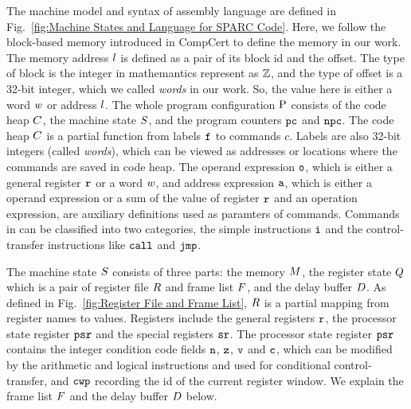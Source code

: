 		

The machine model and syntax of \sparc{} assembly language
are defined in Fig.~\ref{fig:Machine States and Language for SPARC Code}. 
Here, we follow the block-based memory \cite{CompCertMM} introduced 
in CompCert to define the memory in our work.   
The memory address $l$ is defined as a pair of 
its block id and the offset. The type of block is the integer 
in mathemantics represent as $\mathbb{Z}$, and the type of offset 
is a 32-bit integer, which we called {\it words} in our work. 
So, the value here is either a word $w$ or address $l$.  
The whole program configuration $\text{P}$ consists of the code heap
$C$, the machine state $S$, and the program counters $\texttt{pc}$
and $\texttt{npc}$.
The code heap $C$ is a partial function
from labels $\texttt{f}_{}$ to commands $c$.
Labels are also 32-bit integers (called {\em words}),
which can be viewed as addresses or locations 
where the commands are saved in code heap. 
The operand expression $\texttt{o}$, which is either a general 
register $\texttt{r}_{}$ or a word $w$, 
and address expression $\texttt{a}$, 
which is either a operand expression or a 
sum of the value of register $\texttt{r}_{}$ and an operation 
expression, are auxiliary definitions used as paramters of commands. 
Commands in \sparc{} can be classified into two categories,
the simple instructions $\texttt{i}$ and the
control-transfer instructions like $\texttt{call}$ and $\texttt{jmp}$.

The machine state $S$ consists of three parts:
the memory $M$, the register state $Q$
which is a pair of register file $R$ and frame list $F$,
and the delay buffer $D$.
As defined in Fig.~\ref{fig:Register File and Frame List},
$R$ is a partial mapping
from register names to values.
Registers include the general registers $\texttt{r}$,
the processor state register $\texttt{psr}$
and the special registers $\texttt{sr}$.
The processor state register $\texttt{psr}$ contains
the integer condition code fields $\texttt{n}$,
$\texttt{z}$, $\texttt{v}$ and $\texttt{c}$,
which can be modified by the arithmetic and logical instructions
and used for conditional control-transfer,
and $\texttt{cwp}$ recording the id of the current register window.
We explain the frame list $F$ and the delay buffer
$D$ below.

